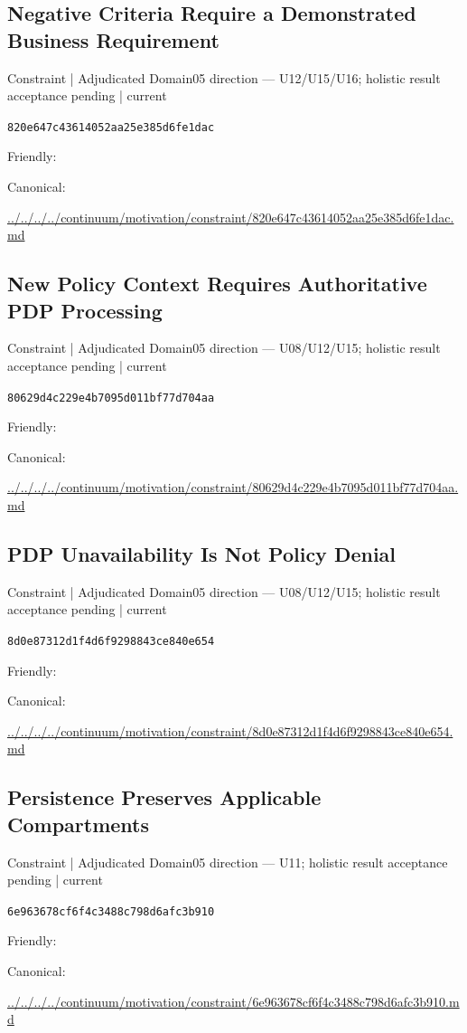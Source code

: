 \documentclass[10pt,a4paper]{article}
\begin{document}
\subsection*{Negative Criteria Require a Demonstrated Business Requirement}
{\small Constraint | Adjudicated Domain05 direction — U12/U15/U16; holistic result acceptance pending | current}\par
\texttt{820e647c43614052aa25e385d6fe1dac}\par
Friendly: \par
Canonical: \par
{\footnotesize\url{../../../../continuum/motivation/constraint/820e647c43614052aa25e385d6fe1dac.md}}\par
\subsection*{New Policy Context Requires Authoritative PDP Processing}
{\small Constraint | Adjudicated Domain05 direction — U08/U12/U15; holistic result acceptance pending | current}\par
\texttt{80629d4c229e4b7095d011bf77d704aa}\par
Friendly: \par
Canonical: \par
{\footnotesize\url{../../../../continuum/motivation/constraint/80629d4c229e4b7095d011bf77d704aa.md}}\par
\subsection*{PDP Unavailability Is Not Policy Denial}
{\small Constraint | Adjudicated Domain05 direction — U08/U12/U15; holistic result acceptance pending | current}\par
\texttt{8d0e87312d1f4d6f9298843ce840e654}\par
Friendly: \par
Canonical: \par
{\footnotesize\url{../../../../continuum/motivation/constraint/8d0e87312d1f4d6f9298843ce840e654.md}}\par
\subsection*{Persistence Preserves Applicable Compartments}
{\small Constraint | Adjudicated Domain05 direction — U11; holistic result acceptance pending | current}\par
\texttt{6e963678cf6f4c3488c798d6afc3b910}\par
Friendly: \par
Canonical: \par
{\footnotesize\url{../../../../continuum/motivation/constraint/6e963678cf6f4c3488c798d6afc3b910.md}}\par
\end{document}
